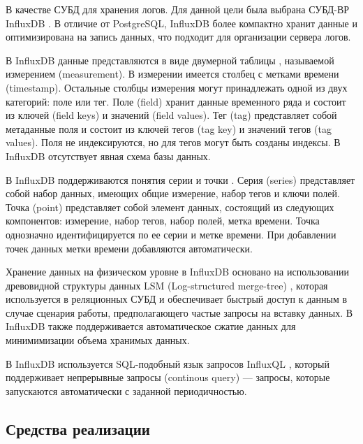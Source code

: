 В качестве СУБД для хранения логов. Для данной цели была выбрана СУБД-ВР InfluxDB \cite{InfluxDB}. В отличие от PostgreSQL, InfluxDB более компактно хранит данные и оптимизирована на запись данных, что подходит для организации сервера логов.


В InfluxDB данные представляются в виде двумерной таблицы \cite{time_series}, называемой измерением (measurement). В измерении имеется столбец с метками времени (timestamp). Остальные столбцы измерения могут принадлежать одной из двух категорий: поле или тег. Поле (field) хранит данные временного ряда и состоит из ключей (field keys) и значений (field values). Тег (tag) представляет собой метаданные поля и состоит из ключей тегов (tag key) и значений тегов (tag values). Поля не индексируются, но для тегов могут быть созданы индексы. В InfluxDB отсутствует явная схема базы данных.

В InfluxDB поддерживаются понятия серии и точки \cite{time_series}. Серия (series) представляет собой набор данных, имеющих общие измерение, набор тегов и ключи полей. Точка (point) представляет собой элемент данных, состоящий из следующих компонентов: измерение, набор тегов, набор полей, метка времени. Точка однозначно идентифицируется по ее серии и метке времени. При добавлении точек данных метки времени добавляются автоматически.

Хранение данных на физическом уровне в InfluxDB основано на использовании древовидной структуры данных LSM (Log-structured merge-tree) \cite{log_tree}, которая используется в реляционных СУБД и обеспечивает быстрый доступ к данным в случае сценария работы, предполагающего частые запросы на вставку данных. В InfluxDB также поддерживается автоматическое сжатие данных для минимимизации объема хранимых данных. \cite{time_series}

В InfluxDB используется SQL-подобный язык запросов InfluxQL \cite{InfluxQL}, который поддерживает непрерывные запросы (continous query) --- запросы, которые запускаются автоматически с заданной периодичностью.



\subsection{Средства реализации}

